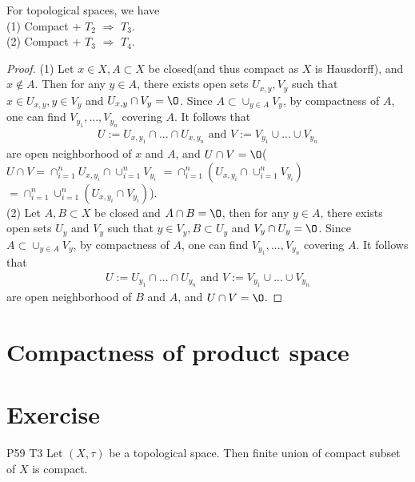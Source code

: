 \begin{proposition}{}{}
    For topological spaces, we have\\
    (1) Compact + $T_2$ $\Rightarrow$ $T_3$.\\
    (2) Compact + $T_3$ $\Rightarrow$ $T_4$.
\end{proposition}

\begin{proof}
    (1) Let $x\in X, A\subset X$ be closed(and thus compact as $X$ is Hausdorff), and $x\notin A$.
    Then for any $y\in A$, there exists open sets $U_{x,y},V_y$ such that $x\in U_{x,y}, y\in V_y$ and $U_{x,y}\cap V_y=\O$.
    Since $A\subset \cup_{y\in A}V_y$, by compactness of $A$, one can find $V_{y_1},...,V_{y_n}$ covering $A$. It follows that 
    \begin{align*}
        U:= U_{x,y_1}\cap ...\cap U_{x,y_n}\text{ and } V:=V_{y_1}\cup ...\cup V_{y_n}
    \end{align*} 
    are open neighborhood of $x$ and $A$, and $U\cap V=\O$( $U\cap V=\cap_{i=1}^{n}U_{x,y_i}\cap \cup_{i=1}^{n}V_{y_i}$
    $=\cap_{i=1}^{n}(U_{x,y_i}\cap \cup_{i=1}^{n}V_{y_i})$$=\cap_{i=1}^{n}\cup_{i=1}^{n}(U_{x,y_i}\cap V_{y_i})$).
    \\
    (2) Let $A,B\subset X$ be closed and $A\cap B=\O$, then for any $y\in A$, there exists open sets $U_y$ and $V_y$ such that
    $y\in V_y,B\subset U_y$ and $V_y\cap U_y=\O$. Since $A\subset \cup_{y\in A}V_y$, by compactness of $A$, 
    one can find $V_{y_1},...,V_{y_n}$ covering $A$. It follows that
    \begin{align*}
        U:= U_{y_1}\cap ...\cap U_{y_n} \text{ and } V:=V_{y_1}\cup...\cup V_{y_n}
    \end{align*}
    are open neighborhood of $B$ and $A$, and $U\cap V=\O$.
\end{proof}



\section{Compactness of product space}



\section{Exercise}
\begin{exercise}{P59 T3}{}
    Let $(X,\tau)$ be a topological space. 
    Then finite union of compact subset of $X$ is compact.
\end{exercise}

